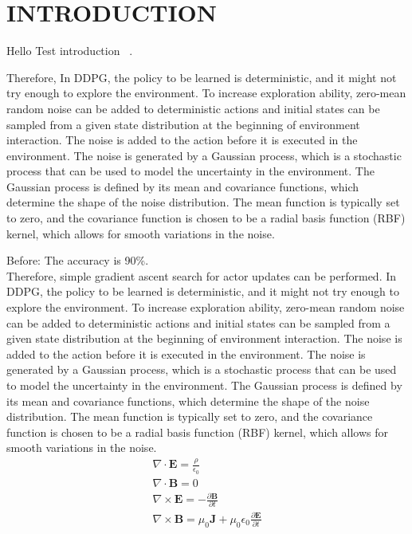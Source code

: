 \section{INTRODUCTION}

Hello Test introduction~ \cite{Sethian1996}.

Therefore, 
In DDPG, the policy to be learned is deterministic, and it might not try 
enough to explore the environment. To increase exploration ability, 
zero-mean random noise can be added to deterministic actions and initial 
states can be sampled from a given state distribution at the beginning 
of environment interaction. The noise is added to the action before it 
is executed in the environment. The noise is generated by a Gaussian process, 
which is a stochastic process that can be used to model the uncertainty in the environment. 
The Gaussian process is defined by its mean and covariance functions, 
which determine the shape of the noise distribution. The mean function is typically set to zero, 
and the covariance function is chosen to 
be a radial basis function (RBF) kernel, which allows for smooth variations in the noise.

\begin{reviewbox}{3.2} %
    Before: The accuracy is 90\%. \\
    Therefore, simple gradient ascent search for actor updates can be performed. 
    In DDPG, the policy to be learned is deterministic, and it might not try 
    enough to explore the environment. To increase exploration ability, 
    zero-mean random noise can be added to deterministic actions and initial 
    states can be sampled from a given state distribution at the beginning 
    of environment interaction. The noise is added to the action before it 
    is executed in the environment. The noise is generated by a Gaussian process, 
    which is a stochastic process that can be used to model the uncertainty in the environment. 
    The Gaussian process is defined by its mean and covariance functions, 
    which determine the shape of the noise distribution. The mean function is typically set to zero, 
    and the covariance function is chosen to 
    be a radial basis function (RBF) kernel, which allows for smooth variations in the noise.
    \begin{gather}
        \nabla \cdot \mathbf{E} = \frac{\rho}{\epsilon_0} \\ 
        \nabla \cdot \mathbf{B} = 0 \\ 
        \nabla \times \mathbf{E} = -\frac{\partial \mathbf{B}}{\partial t} \\ 
        \nabla \times \mathbf{B} = \mu_0 \mathbf{J} + \mu_0 \epsilon_0 \frac{\partial \mathbf{E}}{\partial t}
    \end{gather}
\end{reviewbox}




